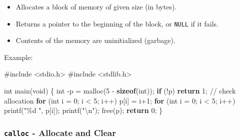 \documentclass[
  letterpaper,
  DIV=11,
  numbers=noendperiod]{scrreprt}
\newenvironment{Shaded}{\begin{snugshade}}{\end{snugshade}}
\newcommand{\CommentTok}[1]{\textcolor[rgb]{0.37,0.37,0.37}{#1}}
\newcommand{\ControlFlowTok}[1]{\textcolor[rgb]{0.00,0.23,0.31}{\textbf{#1}}}
\newcommand{\DataTypeTok}[1]{\textcolor[rgb]{0.68,0.00,0.00}{#1}}
\newcommand{\DecValTok}[1]{\textcolor[rgb]{0.68,0.00,0.00}{#1}}
\newcommand{\ImportTok}[1]{\textcolor[rgb]{0.00,0.46,0.62}{#1}}
\newcommand{\KeywordTok}[1]{\textcolor[rgb]{0.00,0.23,0.31}{\textbf{#1}}}
\newcommand{\NormalTok}[1]{\textcolor[rgb]{0.00,0.23,0.31}{#1}}
\newcommand{\OperatorTok}[1]{\textcolor[rgb]{0.37,0.37,0.37}{#1}}
\newcommand{\PreprocessorTok}[1]{\textcolor[rgb]{0.68,0.00,0.00}{#1}}
\newcommand{\SpecialCharTok}[1]{\textcolor[rgb]{0.37,0.37,0.37}{#1}}
\newcommand{\StringTok}[1]{\textcolor[rgb]{0.13,0.47,0.30}{#1}}
\providecommand{\tightlist}{%
  \setlength{\itemsep}{0pt}\setlength{\parskip}{0pt}}
\begin{document}
\begin{itemize}
\tightlist
\item
  Allocates a block of memory of given size (in bytes).
\item
  Returns a pointer to the beginning of the block, or \texttt{NULL} if
  it fails.
\item
  Contents of the memory are uninitialized (garbage).
\end{itemize}

Example:

\begin{Shaded}
\begin{Highlighting}[]
\PreprocessorTok{\#include }\ImportTok{\textless{}stdio.h\textgreater{}}
\PreprocessorTok{\#include }\ImportTok{\textless{}stdlib.h\textgreater{}}

\DataTypeTok{int}\NormalTok{ main}\OperatorTok{(}\DataTypeTok{void}\OperatorTok{)} \OperatorTok{\{}
    \DataTypeTok{int} \OperatorTok{{-}}\NormalTok{p }\OperatorTok{=}\NormalTok{ malloc}\OperatorTok{(}\DecValTok{5} \OperatorTok{{-}} \KeywordTok{sizeof}\OperatorTok{(}\DataTypeTok{int}\OperatorTok{));}
    \ControlFlowTok{if} \OperatorTok{(!}\NormalTok{p}\OperatorTok{)} \ControlFlowTok{return} \DecValTok{1}\OperatorTok{;}  \CommentTok{// check allocation}
    \ControlFlowTok{for} \OperatorTok{(}\DataTypeTok{int}\NormalTok{ i }\OperatorTok{=} \DecValTok{0}\OperatorTok{;}\NormalTok{ i }\OperatorTok{\textless{}} \DecValTok{5}\OperatorTok{;}\NormalTok{ i}\OperatorTok{++)}\NormalTok{ p}\OperatorTok{[}\NormalTok{i}\OperatorTok{]} \OperatorTok{=}\NormalTok{ i}\OperatorTok{+}\DecValTok{1}\OperatorTok{;}
    \ControlFlowTok{for} \OperatorTok{(}\DataTypeTok{int}\NormalTok{ i }\OperatorTok{=} \DecValTok{0}\OperatorTok{;}\NormalTok{ i }\OperatorTok{\textless{}} \DecValTok{5}\OperatorTok{;}\NormalTok{ i}\OperatorTok{++)}\NormalTok{ printf}\OperatorTok{(}\StringTok{"}\SpecialCharTok{\%d}\StringTok{ "}\OperatorTok{,}\NormalTok{ p}\OperatorTok{[}\NormalTok{i}\OperatorTok{]);}
\NormalTok{    printf}\OperatorTok{(}\StringTok{"}\SpecialCharTok{\textbackslash{}n}\StringTok{"}\OperatorTok{);}
\NormalTok{    free}\OperatorTok{(}\NormalTok{p}\OperatorTok{);}
    \ControlFlowTok{return} \DecValTok{0}\OperatorTok{;}
\OperatorTok{\}}
\end{Highlighting}
\end{Shaded}

\subsubsection{\texorpdfstring{\texttt{calloc} - Allocate and
Clear}{calloc - Allocate and Clear}}\label{calloc---allocate-and-clear}
\end{document}
